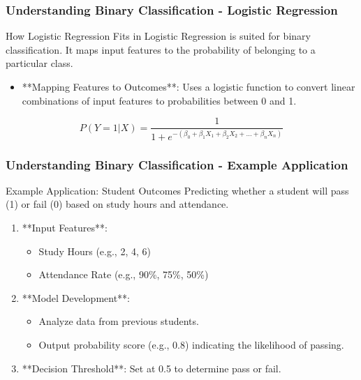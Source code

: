 \documentclass[aspectratio=169]{beamer}
\begin{document}
\begin{frame}[fragile]
    \frametitle{Understanding Binary Classification - Logistic Regression}
    \begin{block}{How Logistic Regression Fits in}
        Logistic Regression is suited for binary classification. It maps input features to the probability of belonging to a particular class.
    \end{block}
    \begin{itemize}
        \item **Mapping Features to Outcomes**: Uses a logistic function to convert linear combinations of input features to probabilities between 0 and 1.
    \end{itemize}
    \begin{equation}
        P(Y=1 | X) = \frac{1}{1 + e^{-(\beta_0 + \beta_1X_1 + \beta_2X_2 + \ldots + \beta_nX_n)}}
    \end{equation}
\end{frame}

\begin{frame}[fragile]
    \frametitle{Understanding Binary Classification - Example Application}
    \begin{block}{Example Application: Student Outcomes}
        Predicting whether a student will pass (1) or fail (0) based on study hours and attendance.
    \end{block}
    \begin{enumerate}
        \item **Input Features**: 
            \begin{itemize}
                \item Study Hours (e.g., 2, 4, 6)
                \item Attendance Rate (e.g., 90\%, 75\%, 50\%)
            \end{itemize}
        \item **Model Development**:
            \begin{itemize}
                \item Analyze data from previous students.
                \item Output probability score (e.g., 0.8) indicating the likelihood of passing.
            \end{itemize}
        \item **Decision Threshold**: Set at 0.5 to determine pass or fail.
    \end{enumerate}
\end{frame}
\end{document}
